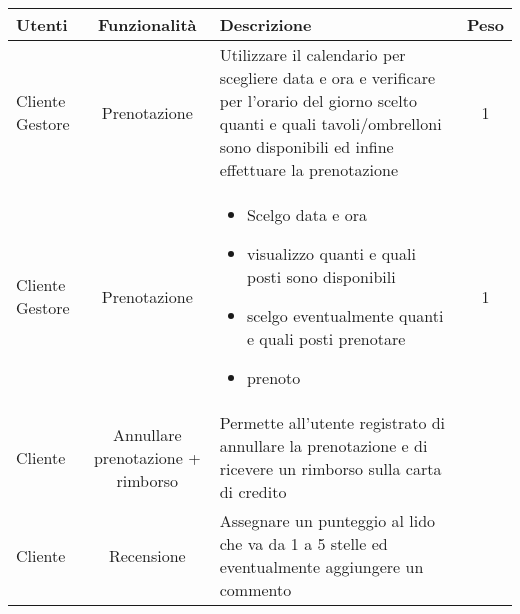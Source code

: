 \documentclass[a4paper]{article}
\begin{document}
\begin{tabularx}{\textwidth}{p{}cXc}
\toprule
Utenti & Funzionalità & Descrizione & Peso \\

\midrule
Cliente \newline Gestore & Prenotazione & Utilizzare il calendario per scegliere data e ora e verificare per l’orario del giorno scelto quanti e quali tavoli/ombrelloni
sono disponibili ed infine effettuare la prenotazione & 1\\

\midrule
Cliente \newline Gestore & Prenotazione & 
\begin{itemize}
\item Scelgo data e ora
\item visualizzo quanti e quali posti sono disponibili
\item scelgo eventualmente quanti e quali posti prenotare
\item prenoto
\end{itemize}
& 1\\

\midrule
Cliente & Annullare prenotazione + rimborso & Permette all'utente registrato di annullare la prenotazione e di ricevere un rimborso sulla carta di credito\\

\midrule
Cliente & Recensione & Assegnare un punteggio al lido che va da 1 a 5 stelle ed eventualmente aggiungere un commento\\


\bottomrule
\end{tabularx}
\end{document}
